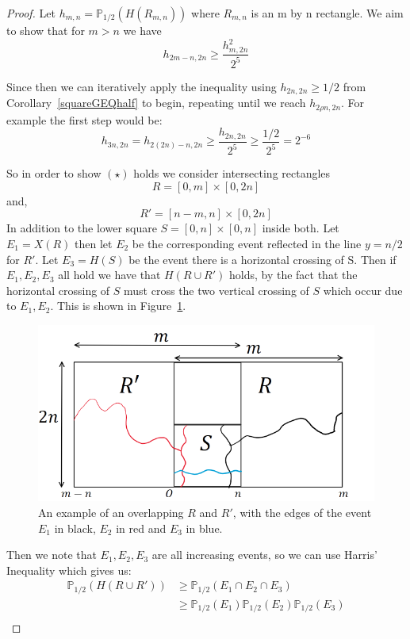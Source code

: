 \documentclass[a4paper,11pt]{article}
\theoremstyle{definition}
\newcommand{\prbhlf}{\mathbb{P}_{1/2}}
\begin{document}
\begin{proof}
	Let $h_{m,n} = \mathbb{P}_{1/2}(H(R_{m,n}))$ where $R_{m,n}$ is an m by n rectangle. We aim to show that for $m>n$ we have
	\[
		h_{2m-n,2n} \geq \frac{h_{m,2n}^2}{2^5} \tag{$\star$}
	\]
	
	Since then we can iteratively apply the inequality using ${h_{2n,2n} \geq 1/2}$ from Corollary~\ref*{squareGEQhalf} to begin, repeating until we reach $h_{2\rho n,2n}$. For example the first step would be:
	$$h_{3n,2n} =h_{2(2n) -n,2n} \geq \frac{h_{2n,2n}}{2^5} \geq \frac{1/2}{2^5} = 2^{-6}$$

	So in order to show $(\star)$ holds we consider intersecting rectangles $$R = [0,m]\times [0,2n]$$ and, $$R' = [n-m,n] \times [0,2n]$$ In addition to the lower square $S = [0,n] \times [0,n]$ inside both.
	Let $E_1 = X(R)$ then let $E_2$ be the corresponding event reflected in the line $y=n/2$ for $R'$. Let $E_3 = H(S)$ be the event there is a horizontal crossing of S.
	Then if $E_1,E_2,E_3$ all hold we have that $H(R \cup  R')$ holds, by the fact that the horizontal crossing of $S$ must cross the two vertical crossing of $S$ which occur due to $E_1,E_2$. This is shown in Figure~\ref{fig:doubleRectangle}.
	\begin{figure}
		\centering
		\includegraphics[scale=0.6]{drawings/doubleRectangle.png}
		\caption{An example of an overlapping $R$ and $R'$, with the edges of the event $E_1$ in black, $E_2$ in red and $E_3$ in blue.}
		\label{fig:doubleRectangle}
	\end{figure}
	Then we note that $E_1,E_2,E_3$ are all increasing events, so we can use Harris' Inequality which gives us:
	\begin{align*}
	\prbhlf(H(R \cup R')) &\geq \prbhlf(E_1 \cap E_2\cap E_3)\\
	& \geq \prbhlf(E_1)\prbhlf(E_2)\prbhlf(E_3)\\

\end{align*}
\end{proof}
\end{document}
